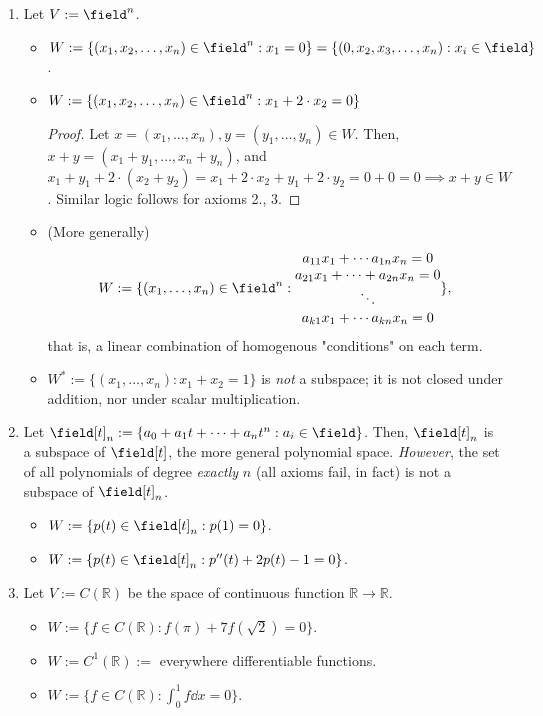 \begin{example}
    \begin{enumerate}
        \item Let $V := \field^n$.
        \begin{itemize}
            \item $W:= \{(x_1, x_2, \dots, x_n) \in \field^n:x_1 = 0\} = \{(0, x_2, x_3, \dots, x_n) :x_i \in \field\}$.
            \item $W:= \{(x_1, x_2, \dots, x_n)\in \field^n : x_1 + 2 \cdot x_2 = 0\}$
            \begin{proof}
                Let $x = (x_1, \dots, x_n), y=(y_1, \dots, y_n) \in W$. Then, $x+y = (x_1 + y_1, \dots, x_n + y_n)$, and $x_1 + y_1 + 2 \cdot (x_2 + y_2) = x_1 + 2 \cdot x_2 + y_1 + 2 \cdot y_2 = 0 + 0 = 0 \implies x+ y \in W$. Similar logic follows for axioms 2., 3.
            \end{proof}
            \item (More generally) $$
            W := \{(x_1, \dots, x_n) \in \field^n : \begin{matrix}
                a_{11} x_1 + \cdots a_{1n} x_n = 0\\
                a_{21} x_1 + \cdots + a_{2n} x_n = 0\\
                \ddots\\
                a_{k1} x_1 + \cdots a_{kn} x_n = 0
            \end{matrix}            
                \},
            $$
            that is, a linear combination of homogenous "conditions" on each term.
            \item $W^*:= \{(x_1, \dots, x_n) : x_1 + x_2 = 1\}$ is \emph{not} a subspace; it is not closed under addition, nor under scalar multiplication.
        \end{itemize}
        \item Let $\field[t]_n :=  \{a_0 + a_1 t + \cdots + a_n t^n : a_i \in \field\}$. Then, $\field[t]_n$ is a subspace of $\field[t]$, the more general polynomial space. \emph{However}, the set of all polynomials of degree \emph{exactly} $n$ (all axioms fail, in fact) is not a subspace of $\field[t]_n$.
        \begin{itemize}
            \item $W:= \{p(t) \in \field[t]_n : p(1)=0 \}$.
            \item $W:=\{p(t) \in \field[t]_n : p''(t) + 2p(t) -1 = 0\}$.
        \end{itemize}
        \item Let $V := C(\mathbb{R})$ be the space of continuous function $\mathbb{R} \to \mathbb{R}$.
        \begin{itemize}
            \item $W := \{f \in C(\mathbb{R}) : f(\pi) + 7 f(\sqrt{2}) = 0 \}$.
            \item $W := C^1(\mathbb{R}) :=$ everywhere differentiable functions.
            \item $W:= \{ f \in C(\mathbb{R}) : \int_0^1 f \dd{x} = 0\}$.
        \end{itemize}
    \end{enumerate}
\end{example}

